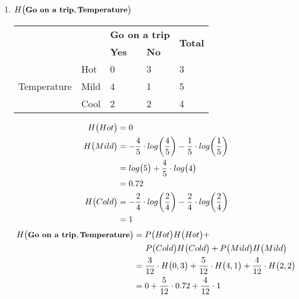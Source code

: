 \documentclass[11pt]{article}
\begin{document}
	\begin{enumerate}
		\item $H \big(\small \textbf{Go on a trip},\textbf{Temperature}\big)$  
\begin{table}[!ht]
	\centering
	\begin{tabular}{|l|l|l|l|l|}
		\hline
		\multicolumn{2}{|l|}{\multirow{2}{*}{}} & \multicolumn{2}{l|}{\textbf{Go on a trip}} & \multirow{2}{*}{\textbf{Total}} \\ \cline{3-4}
		\multicolumn{2}{|l|}{}                  & \textbf{Yes}         & \textbf{No}         &                                 \\ \hline
		\multirow{3}{*}{Temperature}   & Hot    & 0                    & 3                   & 3                               \\ \cline{2-5} 
		& Mild   & 4                    & 1                   & 5                               \\ \cline{2-5} 
		& Cool   & 2                    & 2                   & 4                               \\ \hline
	\end{tabular}
\end{table}
\begin{align*}
	H \big(\small Hot\big) &= 0 \\ 
	H \big(\small Mild\big) &= - \frac{4}{5} \cdot log \bigg(\frac{4}{5} \bigg) - \frac{1}{5} \cdot log \bigg(\frac{1}{5} \bigg) \\
							&=  log \big(5 \big) + \frac{4}{5} \cdot log \big(4\big) \\
							&= 0.72 \\
	H \big(\small Cold\big) &= - \frac{2}{4} \cdot log \bigg(\frac{2}{4} \bigg) - \frac{2}{4} \cdot log \bigg(\frac{2}{4} \bigg) \\
							&= 1
\end{align*}
		\begin{align*}
			H \big(\small \textbf{Go on a trip},\textbf{Temperature}\big) &=  P \big( Hot \big) H \big(\small Hot\big) + \\
			& \hspace{0.5cm} P \big(Cold \big) H \big(\small Cold \big)  + P \big(Mild \big) H \big(\small Mild\big) \\
			&= \frac{3}{12} \cdot H \big(0, 3\big) + \frac{5}{12} \cdot H \big(4, 1\big) + \frac{4}{12} \cdot H \big(2, 2\big) \\
			&= 0 + \frac{5}{12} \cdot 0.72 + \frac{4}{12} \cdot 1 \\

\end{align*}
\end{enumerate}
\end{document}
